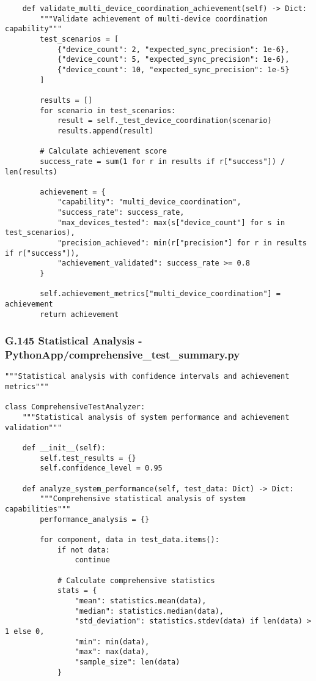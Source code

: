 \documentclass[11pt,a4paper]{article}
\begin{document}
{{\begin{verbatim}
    def validate_multi_device_coordination_achievement(self) -> Dict:
        """Validate achievement of multi-device coordination capability"""
        test_scenarios = [
            {"device_count": 2, "expected_sync_precision": 1e-6},
            {"device_count": 5, "expected_sync_precision": 1e-6},
            {"device_count": 10, "expected_sync_precision": 1e-5}
        ]

        results = []
        for scenario in test_scenarios:
            result = self._test_device_coordination(scenario)
            results.append(result)

        # Calculate achievement score
        success_rate = sum(1 for r in results if r["success"]) / len(results)

        achievement = {
            "capability": "multi_device_coordination",
            "success_rate": success_rate,
            "max_devices_tested": max(s["device_count"] for s in test_scenarios),
            "precision_achieved": min(r["precision"] for r in results if r["success"]),
            "achievement_validated": success_rate >= 0.8
        }

        self.achievement_metrics["multi_device_coordination"] = achievement
        return achievement
\end{verbatim}

\subsubsection{G.145 Statistical Analysis - PythonApp/comprehensive_test_summary.py}

\begin{verbatim}
"""Statistical analysis with confidence intervals and achievement metrics"""

class ComprehensiveTestAnalyzer:
    """Statistical analysis of system performance and achievement validation"""

    def __init__(self):
        self.test_results = {}
        self.confidence_level = 0.95

    def analyze_system_performance(self, test_data: Dict) -> Dict:
        """Comprehensive statistical analysis of system capabilities"""
        performance_analysis = {}

        for component, data in test_data.items():
            if not data:
                continue

            # Calculate comprehensive statistics
            stats = {
                "mean": statistics.mean(data),
                "median": statistics.median(data),
                "std_deviation": statistics.stdev(data) if len(data) > 1 else 0,
                "min": min(data),
                "max": max(data),
                "sample_size": len(data)
            }


\end{verbatim}}}
\end{document}
